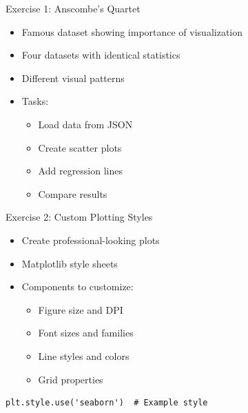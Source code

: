 \documentclass{beamer}
\begin{document}
\begin{frame}{Exercise 1: Anscombe's Quartet}
    \begin{itemize}
        \item Famous dataset showing importance of visualization
        \item Four datasets with identical statistics
        \item Different visual patterns
        \item Tasks:
        \begin{itemize}
            \item Load data from JSON
            \item Create scatter plots
            \item Add regression lines
            \item Compare results
        \end{itemize}
    \end{itemize}
\end{frame}

\begin{frame}[fragile]{Exercise 2: Custom Plotting Styles}
    \begin{itemize}
        \item Create professional-looking plots
        \item Matplotlib style sheets
        \item Components to customize:
        \begin{itemize}
            \item Figure size and DPI
            \item Font sizes and families
            \item Line styles and colors
            \item Grid properties
        \end{itemize}
    \end{itemize}
    \vspace{1em}
    \begin{lstlisting}
plt.style.use('seaborn')  # Example style
    \end{lstlisting}
\end{frame}
\end{document}
